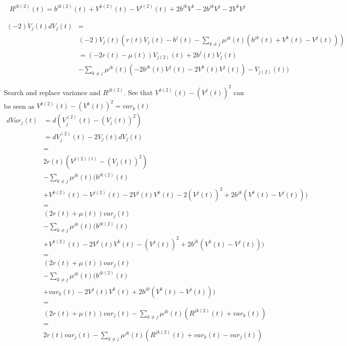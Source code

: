 \documentclass[12pt]{article}
\begin{document}
\begin{equation}
\begin{split}
R^{jk(2)}(t) = b^{jk(2)}(t) + V^{k(2)}(t) - V^{j(2)}(t) + 2b^{jk}V^k - 2b^{jk}V^j - 2V^kV^j
\end{split}
\end{equation}

\begin{equation}
\begin{split}
(-2) V_j(t)dV_j(t) & = \\
& (-2) V_j(t) (r(t)V_j(t) - b^j(t) - \sum_{k \neq j} \mu^{jk}(t) (b^{jk}(t) + V^k(t) - V^j(t))) \\
& = (-2r(t)-\mu(t))V_{j(2)}(t) + 2b^j(t)V_j(t) \\
& - \sum_{k \neq j} \mu^{jk}(t) (-2b^{jk}(t)V^j(t) - 2V^k(t)V^j(t))-V_{j(2)}(t))
\end{split}
\end{equation}

Search and replace variance and $R^{jk(2)}$. See that $V^{k(2)}(t) - (V^j(t))^2$ can be seen as $V^{k(2)}(t) - (V^k(t))^2 = var_k(t)$
\begin{equation}
\begin{split}
dVar_j(t) 	& = d(V_j^{(2)}(t) - (V_j(t))^2) \\
			& = dV_j^{(2)}(t) - 2V_j(t)dV_j(t) \\
			\\
			& = \\
			& 2r(t)(V^{j(2)(t)}-(V_j(t))^2) \\
			& - \sum_{k \neq j} \mu^{jk}(t) ( b^{jk(2)}(t) \\ 
			& + V^{k(2)}(t) - V^{j(2)}(t) - 2V^j(t)V^k(t) - 2(V^j(t))^2+2b^{jk}(V^k(t) - V^j(t)) ) \\
			& = \\
			& (2r(t) + \mu(t))var_j(t) \\
			& - \sum_{k \neq j} \mu^{jk}(t) ( b^{jk(2)}(t) \\ 
			& + V^{k(2)}(t) - 2V^j(t)V^k(t) - (V^j(t))^2+2b^{jk}(V^k(t) - V^j(t)) ) \\
			& = \\
			& (2r(t) + \mu(t))var_j(t) \\
			& - \sum_{k \neq j} \mu^{jk}(t) ( b^{jk(2)}(t) \\ 
			& + var_k(t) - 2V^j(t)V^k(t) + 2b^{jk}(V^k(t) - V^j(t)) ) \\
			& = \\
			& (2r(t) + \mu(t))var_j(t) - \sum_{k \neq j} \mu^{jk}(t) ( R^{jk(2)}(t) + var_k(t) ) \\
			& = \\
			& 2r(t)var_j(t) - \sum_{k \neq j} \mu^{jk}(t) ( R^{jk(2)}(t) + var_k(t) - var_j(t) )
\end{split}
\end{equation}
\end{document}
